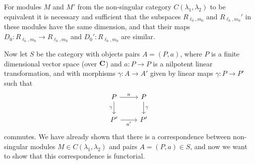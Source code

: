 \begin{corollary}
  For modules $M$ and $M'$ from the non-singular category $C(\lambda_1,\lambda_2)$ to be equivalent it is necessary and sufficient that the subspaces $R_{\ell_0,m_0}$ and $R_{\ell_0,m_0}'$ in these modules have the same dimension, and that their maps $D_0\colon R_{\ell_0,m_0}\to R_{\ell_0,m_0}$ and $D_0'\colon R_{\ell_0,m_0}$ are similar. 
\end{corollary}

Now let $S$ be the category with objects pairs $A=(P,a)$, where $P$ is a finite dimensional vector space (over $\mathbf{C}$) and $a\colon P\to P$ is a nilpotent linear transformation, and with morphisms $\gamma\colon A\to A'$ given by linear maps $\gamma\colon P\to P'$ such that
\[
  \begin{tikzcd}
    P\ar[r,"a"] \ar[d,"\gamma",swap] & P \ar[d,"\gamma"] \\
    P' \ar[r,"a'",swap] & P'
  \end{tikzcd}
\]
commutes. We have already shown that there is a correspondence between non-singular modules $M\in C(\lambda_1,\lambda_2)$ and pairs $A=(P,a)\in S$, and now we want to show that this correspondence is functorial.

